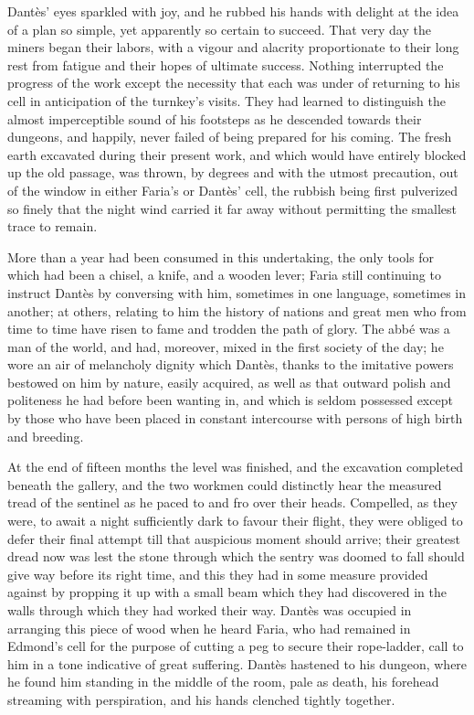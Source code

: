  Dantès' eyes sparkled with joy, and he rubbed his hands with delight at the idea of a plan so simple, yet apparently so certain to succeed. That very day the miners began their labors, with a vigour and alacrity proportionate to their long rest from fatigue and their hopes of ultimate success. Nothing interrupted the progress of the work except the necessity that each was under of returning to his cell in anticipation of the turnkey's visits. They had learned to distinguish the almost imperceptible sound of his footsteps as he descended towards their dungeons, and happily, never failed of being prepared for his coming. The fresh earth excavated during their present work, and which would have entirely blocked up the old passage, was thrown, by degrees and with the utmost precaution, out of the window in either Faria's or Dantès' cell, the rubbish being first pulverized so finely that the night wind carried it far away without permitting the smallest trace to remain. 

 More than a year had been consumed in this undertaking, the only tools for which had been a chisel, a knife, and a wooden lever; Faria still continuing to instruct Dantès by conversing with him, sometimes in one language, sometimes in another; at others, relating to him the history of nations and great men who from time to time have risen to fame and trodden the path of glory. The abbé was a man of the world, and had, moreover, mixed in the first society of the day; he wore an air of melancholy dignity which Dantès, thanks to the imitative powers bestowed on him by nature, easily acquired, as well as that outward polish and politeness he had before been wanting in, and which is seldom possessed except by those who have been placed in constant intercourse with persons of high birth and breeding. 

 At the end of fifteen months the level was finished, and the excavation completed beneath the gallery, and the two workmen could distinctly hear the measured tread of the sentinel as he paced to and fro over their heads. Compelled, as they were, to await a night sufficiently dark to favour their flight, they were obliged to defer their final attempt till that auspicious moment should arrive; their greatest dread now was lest the stone through which the sentry was doomed to fall should give way before its right time, and this they had in some measure provided against by propping it up with a small beam which they had discovered in the walls through which they had worked their way. Dantès was occupied in arranging this piece of wood when he heard Faria, who had remained in Edmond's cell for the purpose of cutting a peg to secure their rope-ladder, call to him in a tone indicative of great suffering. Dantès hastened to his dungeon, where he found him standing in the middle of the room, pale as death, his forehead streaming with perspiration, and his hands clenched tightly together. 

